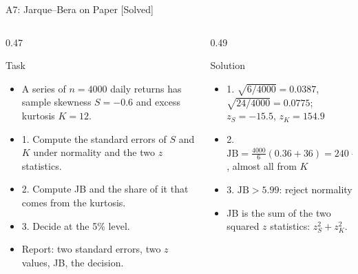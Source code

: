 \begin{frame}{A7: Jarque--Bera on Paper [Solved]}
\itemsize{\footnotesize}
\begin{columns}[T]
\begin{column}{0.47\textwidth}
\begin{block}{Task}
\begin{itemize}
    \item A series of $n = 4000$ daily returns has sample skewness $S = -0.6$ and excess kurtosis $K = 12$.
    \item 1. Compute the standard errors of $S$ and $K$ under normality and the two $z$ statistics.
    \item 2. Compute JB and the share of it that comes from the kurtosis.
    \item 3. Decide at the 5\% level.
    \item Report: two standard errors, two $z$ values, JB, the decision.
\end{itemize}
\end{block}
\end{column}
\begin{column}{0.49\textwidth}
\begin{exampleblock}{Solution}
\begin{itemize}
    \item 1. $\sqrt{6/4000} = 0.0387$, $\sqrt{24/4000} = 0.0775$; $z_S = -15.5$, $z_K = 154.9$
    \item 2. $\text{JB} = \frac{4000}{6}(0.36 + 36) = 240 + 24\,000 = 24\,240$, almost all from $K$
    \item 3. $\text{JB} > 5.99$: reject normality
    \item JB is the sum of the two squared $z$ statistics: $z_S^2 + z_K^2$.
\end{itemize}
\end{exampleblock}
\end{column}
\end{columns}
\end{frame}


